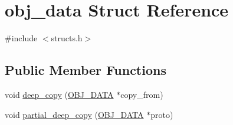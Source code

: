 \hypertarget{structobj__data}{\section{obj\-\_\-data Struct Reference}
\label{structobj__data}
}


{\ttfamily \#include $<$structs.\-h$>$}

\subsection*{Public Member Functions}
\begin{DoxyCompactItemize}
\item 
void \hyperlink{structobj__data_ace2bc3c426d4f6f644df0cce320f2bd5}{deep\-\_\-copy} (\hyperlink{structs_8h_aaa59141dfc8c6ecdb6bfcf1537dd52d1}{O\-B\-J\-\_\-\-D\-A\-T\-A} $\ast$copy\-\_\-from)
\item 
void \hyperlink{structobj__data_aeb2b10e708f597567a9807d2e9ecee0c}{partial\-\_\-deep\-\_\-copy} (\hyperlink{structs_8h_aaa59141dfc8c6ecdb6bfcf1537dd52d1}{O\-B\-J\-\_\-\-D\-A\-T\-A} $\ast$proto)
\end{DoxyCompactItemize}
